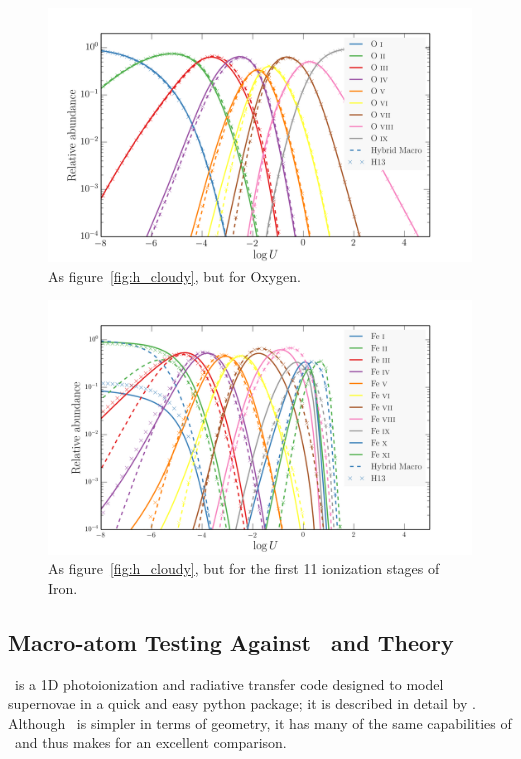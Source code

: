 \begin{figure}
\centering
\includegraphics[width=1.0\textwidth]{figures/03-radtrans/ox_comp.png}
\caption
{
As figure~\ref{fig:h_cloudy}, but for Oxygen.
}
\label{fig:ox_cloudy}
\end{figure}

\begin{figure}
\centering
\includegraphics[width=1.0\textwidth]{figures/03-radtrans/ir_comp.png}
\caption
{
As figure~\ref{fig:h_cloudy}, but for the first 11 ionization stages of Iron.
}
\label{fig:ir_cloudy}
\end{figure}

\subsection{Macro-atom Testing Against \tar\ and Theory}

\index{\tar}
\tar\ is a 1D photoionization and radiative transfer code designed to
model supernovae in a quick and easy python package; it is described in detail by
\cite{kerzendorfsim}. Although \tar\ is simpler in terms
of geometry, it has many of the same capabilities of \py\ and 
thus makes for an excellent comparison. 

